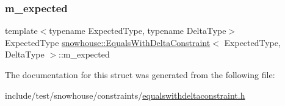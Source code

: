 \subsubsection{\texorpdfstring{m\_expected}{m\_expected}}
{\footnotesize\ttfamily template$<$typename Expected\+Type, typename Delta\+Type$>$ \\
Expected\+Type \mbox{\hyperlink{structsnowhouse_1_1EqualsWithDeltaConstraint}{snowhouse\+::\+Equals\+With\+Delta\+Constraint}}$<$ Expected\+Type, Delta\+Type $>$\+::m\+\_\+expected}



The documentation for this struct was generated from the following file\+:\begin{DoxyCompactItemize}
\item 
include/test/snowhouse/constraints/\mbox{\hyperlink{equalswithdeltaconstraint_8h}{equalswithdeltaconstraint.\+h}}\end{DoxyCompactItemize}
